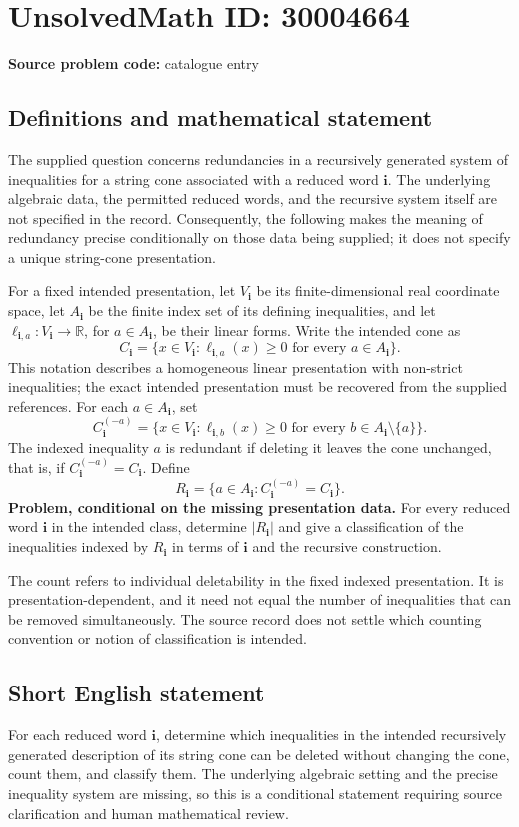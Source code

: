 \documentclass[11pt]{article}
\newcommand{\R}{\mathbb{R}}
\begin{document}
\section*{UnsolvedMath ID: 30004664}
\textbf{Source problem code:} catalogue entry
\subsection{Definitions and mathematical statement}
The supplied question concerns redundancies in a recursively generated system of inequalities for a string cone associated with a reduced word \(\mathbf i\). The underlying algebraic data, the permitted reduced words, and the recursive system itself are not specified in the record. Consequently, the following makes the meaning of redundancy precise conditionally on those data being supplied; it does not specify a unique string-cone presentation.

For a fixed intended presentation, let \(V_{\mathbf i}\) be its finite-dimensional real coordinate space, let \(A_{\mathbf i}\) be the finite index set of its defining inequalities, and let \(\ell_{\mathbf i,a}\colon V_{\mathbf i}\to\R\), for \(a\in A_{\mathbf i}\), be their linear forms. Write the intended cone as
\[
C_{\mathbf i}=\{x\in V_{\mathbf i}:\ell_{\mathbf i,a}(x)\geq 0\text{ for every }a\in A_{\mathbf i}\}.
\]
This notation describes a homogeneous linear presentation with non-strict inequalities; the exact intended presentation must be recovered from the supplied references. For each \(a\in A_{\mathbf i}\), set
\[
C_{\mathbf i}^{(-a)}=\{x\in V_{\mathbf i}:\ell_{\mathbf i,b}(x)\geq 0\text{ for every }b\in A_{\mathbf i}\setminus\{a\}\}.
\]
The indexed inequality \(a\) is redundant if deleting it leaves the cone unchanged, that is, if \(C_{\mathbf i}^{(-a)}=C_{\mathbf i}\). Define
\[
R_{\mathbf i}=\{a\in A_{\mathbf i}:C_{\mathbf i}^{(-a)}=C_{\mathbf i}\}.
\]
\textbf{Problem, conditional on the missing presentation data.} For every reduced word \(\mathbf i\) in the intended class, determine \(\lvert R_{\mathbf i}\rvert\) and give a classification of the inequalities indexed by \(R_{\mathbf i}\) in terms of \(\mathbf i\) and the recursive construction.

The count refers to individual deletability in the fixed indexed presentation. It is presentation-dependent, and it need not equal the number of inequalities that can be removed simultaneously. The source record does not settle which counting convention or notion of classification is intended.
\subsection{Short English statement}
For each reduced word \(\mathbf i\), determine which inequalities in the intended recursively generated description of its string cone can be deleted without changing the cone, count them, and classify them. The underlying algebraic setting and the precise inequality system are missing, so this is a conditional statement requiring source clarification and human mathematical review.
\end{document}
